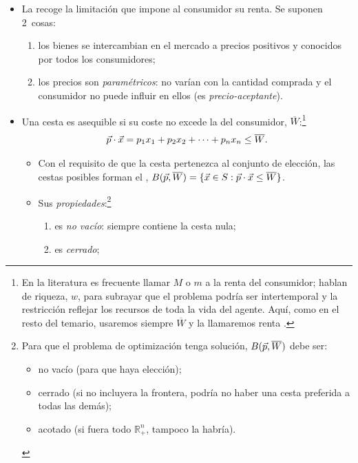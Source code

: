 \documentclass[11pt]{article}
\begin{document}
\begin{itemize}
\item La  recoge la limitación que impone al consumidor su renta. Se suponen 2~cosas:
  \begin{enumerate}
  \item los bienes se intercambian en el mercado a precios positivos y conocidos por todos los consumidores;
  \item los precios son \emph{paramétricos}: no varían con la cantidad comprada y el consumidor no puede influir en ellos (es \emph{precio-aceptante}).
  \end{enumerate}
\item Una cesta es asequible si su coste no excede la  del consumidor, $\overline{W}$:\footnote{En la literatura es frecuente llamar $M$ o $m$ a la renta del consumidor; \textcite{MasColellWhinstonGreen1995} hablan de riqueza, $w$, para subrayar que el problema podría ser intertemporal y la restricción reflejar los recursos de toda la vida del agente. Aquí, como en el resto del temario, usaremos siempre $\overline{W}$ y la llamaremos renta .}
  \begin{equation}
  \vec{p}\cdot \vec{x}=p_1x_1+p_2x_2+\dots+p_nx_n\leq\overline{W}. \label{eq:restriccion}
  \end{equation}
  \begin{itemize}
  \item Con el requisito de que la cesta pertenezca al conjunto de elección, las cestas posibles forman el , $B(\vec{p},\overline{W})=\{\vec{x}\in S: \vec{p}\cdot \vec{x}\leq\overline{W}\}$.
  \item Sus \emph{propiedades}:\footnote{Para que el problema de optimización tenga solución, $B(\vec{p},\overline{W})$ debe ser:
\begin{itemize}
\item no vacío (para que haya elección);
\item cerrado (si no incluyera la frontera, podría no haber una cesta preferida a todas las demás);
\item acotado (si fuera todo $\mathbb{R}^n_+$, tampoco la habría).
\end{itemize}}
    \begin{enumerate}[label=(\roman*)]
    \item es \emph{no vacío}: siempre contiene la cesta nula;
    \item es \emph{cerrado};

\end{enumerate}
\end{itemize}
\end{itemize}
\end{document}
